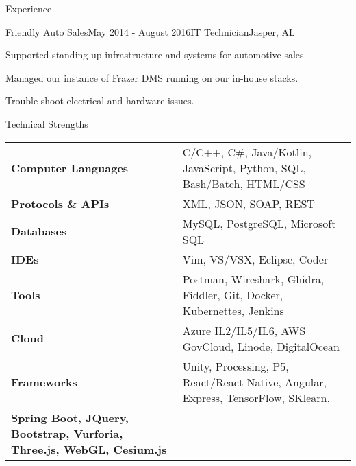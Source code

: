 \documentclass[
	11pt, %
]{crumpcv} %
\begin{document}
\begin{rSection}{Experience}

	\begin{rSubsection}{Friendly Auto Sales}{May 2014 - August 2016}{IT Technician}{Jasper, AL}
		\item Supported standing up infrastructure and systems for automotive sales.
		\item Managed our instance of Frazer DMS running on our in-house stacks.
		\item Trouble shoot electrical and hardware issues. \\
	\end{rSubsection}

\end{rSection}


\begin{rSection}{Technical Strengths}

	\begin{tabular}{@{} >{\bfseries}l @{\hspace{6ex}} l @{}}
		Computer Languages & C/C++, C#, Java/Kotlin, JavaScript, Python, SQL, Bash/Batch, HTML/CSS \\
		Protocols \& APIs & XML, JSON, SOAP, REST \\
		Databases & MySQL, PostgreSQL, Microsoft SQL \\
		IDEs & Vim, VS/VSX, Eclipse, Coder \\
		Tools & Postman, Wireshark, Ghidra, Fiddler, Git, Docker, Kubernettes, Jenkins \\
		Cloud & Azure IL2/IL5/IL6, AWS GovCloud, Linode, DigitalOcean \\
		Frameworks & Unity, Processing, P5, React/React-Native, Angular, Express, TensorFlow, SKlearn, \\
		Spring Boot, JQuery, Bootstrap, Vurforia, Three.js, WebGL, Cesium.js \\
	\end{tabular}

\end{rSection}

\end{document}
